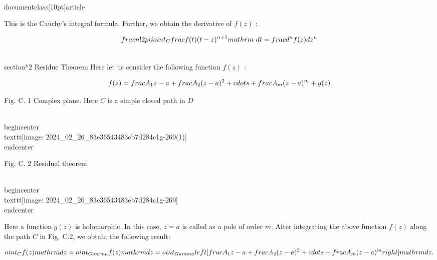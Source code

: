 \\documentclass[10pt]{article}
\begin{document}
{{{{{{This is the Cauchy's integral formula. Further, we obtain the derivative of $f(z)$ :

$$
\\frac{n !}{2 \\pi i} \\oint_{C} \\frac{f(t)}{(t-z)^{n+1}} \\mathrm{~d} t=\\frac{d^{n} f(z)}{d z^{n}}
$$

\\section*{2 Residue Theorem}
Here let us consider the following function $f(z)$ :

$$
f(z)=\\frac{A_{1}}{z-a}+\\frac{A_{2}}{(z-a)^{2}}+\\cdots+\\frac{A_{m}}{(z-a)^{m}}+g(z)
$$

Fig. C. 1 Complex plane. Here $C$ is a simple closed path in $D$

\\begin{center}
\\texttt{[image: 2024\_02\_26\_83e36543483eb7d284c1g-269(1)]}
\\end{center}

Fig. C. 2 Residual theorem

\\begin{center}
\\texttt{[image: 2024\_02\_26\_83e36543483eb7d284c1g-269]}
\\end{center}

Here a function $g(z)$ is holomorphic. In this case, $z=a$ is called as a pole of order $m$. After integrating the above function $f(z)$ along the path $C$ in Fig. C.2, we obtain the following result:

$$
\\oint_{C} f(z) \\mathrm{d} z=\\oint_{\\Gamma} f(z) \\mathrm{d} z=\\oint_{\\Gamma}\\left[\\frac{A_{1}}{z-a}+\\frac{A_{2}}{(z-a)^{2}}+\\cdots+\\frac{A_{m}}{(z-a)^{m}}\\right] \\mathrm{d} z .
$$

}}}}}}
\end{document}
